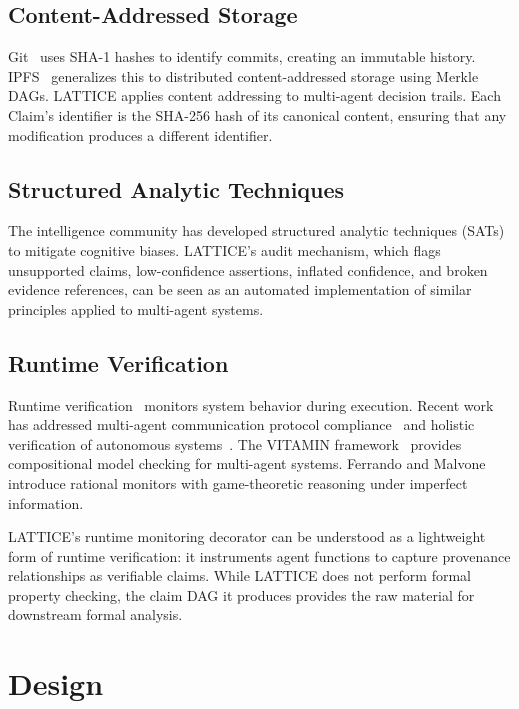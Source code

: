 \documentclass[11pt,twocolumn]{article}
\begin{document}
\subsection{Content-Addressed Storage}

Git~\cite{chacon2014progit} uses SHA-1 hashes to identify commits, creating an immutable history. IPFS~\cite{benet2014ipfs} generalizes this to distributed content-addressed storage using Merkle DAGs. LATTICE applies content addressing to multi-agent decision trails. Each Claim's identifier is the SHA-256 hash of its canonical content, ensuring that any modification produces a different identifier.

\subsection{Structured Analytic Techniques}

The intelligence community has developed structured analytic techniques (SATs)~\cite{heuer2010structured} to mitigate cognitive biases. LATTICE's audit mechanism, which flags unsupported claims, low-confidence assertions, inflated confidence, and broken evidence references, can be seen as an automated implementation of similar principles applied to multi-agent systems.

\subsection{Runtime Verification}

Runtime verification~\cite{leucker2009brief} monitors system behavior during execution. Recent work has addressed multi-agent communication protocol compliance~\cite{ancona2017parametric,ferrando2017decentralizing} and holistic verification of autonomous systems~\cite{ferrando2021holistic}. The VITAMIN framework~\cite{ferrando2025vitamin} provides compositional model checking for multi-agent systems. Ferrando and Malvone~\cite{ferrando2026runtime} introduce rational monitors with game-theoretic reasoning under imperfect information.

LATTICE's runtime monitoring decorator can be understood as a lightweight form of runtime verification: it instruments agent functions to capture provenance relationships as verifiable claims. While LATTICE does not perform formal property checking, the claim DAG it produces provides the raw material for downstream formal analysis.

\section{Design}
\label{sec:design}
\end{document}

